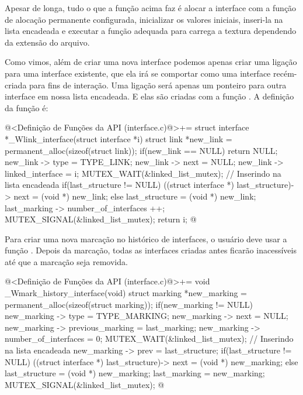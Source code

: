 Apesar de longa, tudo o que a função acima faz é alocar a interface
com a função de alocação permanente configurada, inicializar os
valores iniciais, inseri-la na lista encadeada e executar a função
adequada para carrega a textura dependendo da extensão do arquivo.


Como vimos, além de criar uma nova interface podemos apenas criar uma
ligação para uma interface existente, que ela irá se comportar como
uma interface recém-criada para fins de interação. Uma ligação será
apenas um ponteiro para outra interface em nossa lista encadeada. E
elas são criadas com a função . A
definição da função é:

\iniciocodigo
@<Definição de Funções da API (interface.c)@>+=
struct interface *_Wlink_interface(struct interface *i){
  struct link *new_link = permanent_alloc(sizeof(struct link));
  if(new_link == NULL)
    return NULL;
  new_link -> type = TYPE_LINK;
  new_link -> next = NULL;
  new_link -> linked_interface = i;
  MUTEX_WAIT(&linked_list_mutex); // Inserindo na lista encadeada
  if(last_structure != NULL)
    ((struct interface *) last_structure)-> next = (void *) new_link;
  else
    last_structure = (void *) new_link;
  last_marking -> number_of_interfaces ++;
  MUTEX_SIGNAL(&linked_list_mutex);
  return i;
}
@
\fimcodigo


Para criar uma nova marcação no histórico de interfaces, o usuário
deve usar a função . Depois da
marcação, todas as interfaces criadas antes ficarão inacessíveis até
que a marcação seja removida.

\iniciocodigo
@<Definição de Funções da API (interface.c)@>+=
void _Wmark_history_interface(void){
  struct marking *new_marking = permanent_alloc(sizeof(struct marking));
  if(new_marking != NULL){
    new_marking -> type = TYPE_MARKING;
    new_marking -> next = NULL;
    new_marking -> previous_marking = last_marking;
    new_marking -> number_of_interfaces = 0;
    MUTEX_WAIT(&linked_list_mutex); // Inserindo na lista encadeada
    new_marking -> prev = last_structure;
    if(last_structure != NULL)
      ((struct interface *) last_structure)-> next = (void *) new_marking;
    else
      last_structure = (void *) new_marking;
    last_marking = new_marking;
    MUTEX_SIGNAL(&linked_list_mutex);
  }
}
@
\fimcodigo

